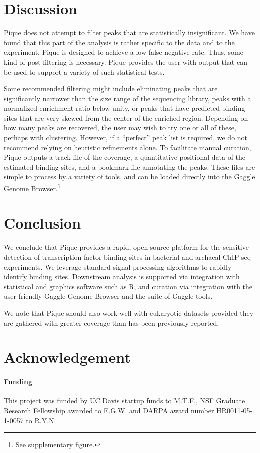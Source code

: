 \documentclass{bioinfo}
\begin{document}
\section{Discussion}

Pique does not attempt to filter peaks that are statistically
insignificant. We have found that this part of the analysis is rather
specific to the data and to the experiment. Pique is designed to
achieve a low false-negative rate. Thus, some kind of post-filtering
is necessary. Pique provides the user with output that can be used to
support a variety of such statistical tests.

Some recommended filtering might include eliminating peaks that are
significantly narrower than the size range of the sequencing library,
peaks with a normalized enrichment ratio below unity, or peaks that
have predicted binding sites that are very skewed from the center of
the enriched region. Depending on how many peaks are recovered, the
user may wish to try one or all of these, perhaps with
clustering. However, if a ``perfect'' peak list is required, we do not
recommend relying on heuristic refinements alone. To facilitate manual
curation, Pique outputs a track file of the coverage, a quantitative
positional data of the estimated binding sites, and a bookmark file
annotating the peaks. These files are simple to process by a variety
of tools, and can be loaded directly into the Gaggle Genome
Browser.\footnote{See supplementary figure.}

\section{Conclusion}

We conclude that Pique provides a rapid, open source platform for the
sensitive detection of transcription factor binding sites in bacterial
and archaeal ChIP-seq experiments. We leverage standard signal
processing algorithms to rapidly identify binding sites. Downstream
analysis is supported via integration with statistical and graphics
software such as R, and curation via integration with the
user-friendly Gaggle Genome Browser and the suite of Gaggle tools.

We note that Pique should also work well with eukaryotic datasets
provided they are gathered with greater coverage than has been
previously reported.

\section*{Acknowledgement}
\paragraph{Funding\textcolon} 

This project was funded by UC Davis startup funds to M.T.F., NSF Graduate
Research Fellowship awarded to E.G.W. and DARPA award number
HR0011-05-1-0057 to R.Y.N.

%
%
%
%
%




\end{document}
